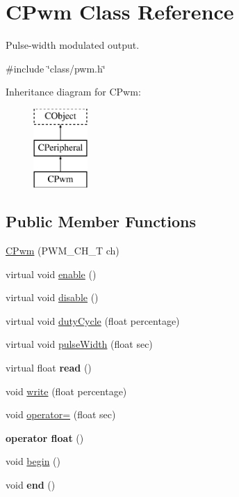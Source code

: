 \hypertarget{class_c_pwm}{\section{C\-Pwm Class Reference}
\label{class_c_pwm}
}


Pulse-\/width modulated output.  




{\ttfamily \#include \char`\"{}class/pwm.\-h\char`\"{}}

Inheritance diagram for C\-Pwm\-:\begin{figure}[H]
\begin{center}
\leavevmode
\includegraphics[height=3.000000cm]{class_c_pwm}
\end{center}
\end{figure}
\subsection*{Public Member Functions}
\begin{DoxyCompactItemize}
\item 
\hyperlink{class_c_pwm_a53beaa27e8d3982351770f425dffb432}{C\-Pwm} (P\-W\-M\-\_\-\-C\-H\-\_\-\-T ch)
\item 
virtual void \hyperlink{class_c_pwm_a640f06df704cc299e45fafb9c1a1972e}{enable} ()
\item 
virtual void \hyperlink{class_c_pwm_a47c790491c994cc959bf204415be2aeb}{disable} ()
\item 
virtual void \hyperlink{class_c_pwm_ae0cb5e7e45453fb3fc049bada896c151}{duty\-Cycle} (float percentage)
\item 
virtual void \hyperlink{class_c_pwm_ae6ea4c5209e4f1360861371c7bf744e7}{pulse\-Width} (float sec)
\item 
\hypertarget{class_c_pwm_af69709834f0c179df1a6d8e7ad314930}{virtual float {\bfseries read} ()}\label{class_c_pwm_af69709834f0c179df1a6d8e7ad314930}

\item 
void \hyperlink{class_c_pwm_a57cbfceb20e1f2970f45b5d1571431d1}{write} (float percentage)
\item 
void \hyperlink{class_c_pwm_aadc2ad3efd1afe9ae32919462c8286cb}{operator=} (float sec)
\item 
\hypertarget{class_c_pwm_a34dc590715ddb4b118132c69dad1140f}{{\bfseries operator float} ()}\label{class_c_pwm_a34dc590715ddb4b118132c69dad1140f}

\item 
void \hyperlink{class_c_pwm_ae8fdd7f2337005c61ec995196de366de}{begin} ()
\item 
\hypertarget{class_c_pwm_aea8cdf467fe4d3e1b3c1547dbfbce4ce}{void {\bfseries end} ()}\label{class_c_pwm_aea8cdf467fe4d3e1b3c1547dbfbce4ce}

\end{DoxyCompactItemize}
